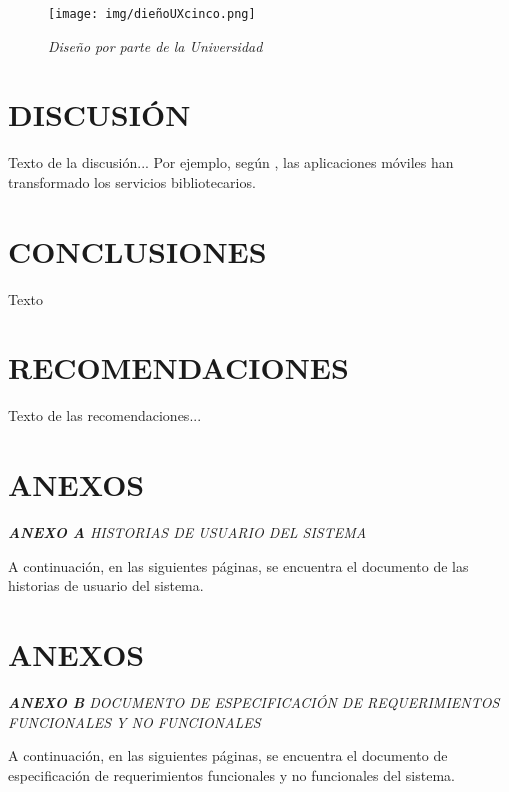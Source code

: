 \documentclass[spanish]{ieee_upb}
\begin{document}
\begin{figure}[H] 
	\centering
	\texttt{[image: img/dieñoUXcinco.png]}
	\vspace{-1mm}
	\caption[Diseño inicial de UX diseñador Lista de Préstamos]{\textit{Diseño por parte de la Universidad}}
	\label{fig:UX5} 
\end{figure}
\newpage
\section{DISCUSIÓN}
Texto de la discusión... Por ejemplo, según \cite{singh2023mobile}, las aplicaciones móviles han transformado los servicios bibliotecarios.

\newpage
\section{CONCLUSIONES}
Texto

\newpage
\section{RECOMENDACIONES}
Texto de las recomendaciones...

\newpage
\renewcommand\refname{REFERENCIAS}



\newpage


\appendix
\section{ANEXOS}
\raggedright\textit{\textbf{ANEXO A} HISTORIAS DE USUARIO DEL SISTEMA}
\label{anexos:historias}

A continuación, en las siguientes páginas, se encuentra el documento de las historias de usuario del sistema. 





\newpage

\section{ANEXOS}
\raggedright\textit{\textbf{ANEXO B} DOCUMENTO DE ESPECIFICACIÓN DE REQUERIMIENTOS FUNCIONALES Y NO FUNCIONALES}
\label{anexos:requerimientos}

A continuación, en las siguientes páginas, se encuentra el documento de especificación de requerimientos funcionales y no funcionales del sistema.


\end{document}
